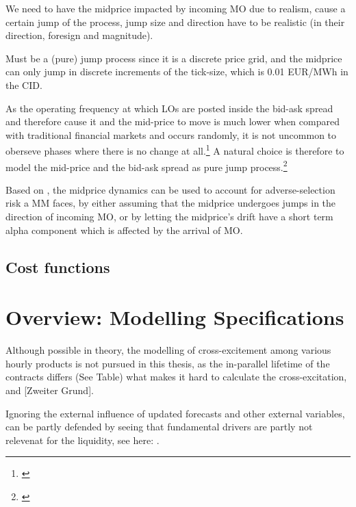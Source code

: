 \documentclass[12pt,a4paper]{cau_thesis}
\begin{document}
We need to have the midprice impacted by incoming MO due to realism,
cause a certain jump of the process, jump size and direction have to
be realistic (in their direction, foresign and magnitude).

Must be a (pure) jump process since it is a discrete price grid, and
the midprice can only jump in discrete increments of the tick-size,
which is 0.01 EUR/MWh in the CID.

As the operating frequency at which LOs are posted inside the bid-ask
spread and therefore cause it and the mid-price to move is much lower
when compared with traditional financial markets and occurs randomly,
it is not uncommon to oberseve phases where there is no change at
all.\footnote{\cite[See ][, p.78]{luckner2021hawkes}} A natural
choice is therefore to model the mid-price and the bid-ask spread as
pure jump process.\footnote{\cite[See ][, p.78]{luckner2021hawkes}}

Based on \cite[See ][, p.262]{cartea2015algorithmic}, the midprice
dynamics can be used to account for adverse-selection risk a MM
faces, by either assuming that the midprice undergoes jumps in the
direction of incoming MO, or by letting the midprice's drift have a
short term alpha component which is affected by the arrival of MO.
\subsection{Cost functions}\label{sub_sec:cost_fuctions}


\section{Overview: Modelling Specifications}\label{sub_sec:overview_modelling_specs}
Although possible in theory, the modelling of cross-excitement among
various hourly products is not pursued in this thesis, as the
in-parallel lifetime of the contracts differs (See Table) what makes
it hard to calculate the cross-excitation, and [Zweiter Grund].

Ignoring the external influence of updated forecasts and other
external variables, can be partly defended by seeing that fundamental
drivers are partly not relevenat for the liquidity, see here:
\cite{hagemann2013empirical}.
\end{document}
